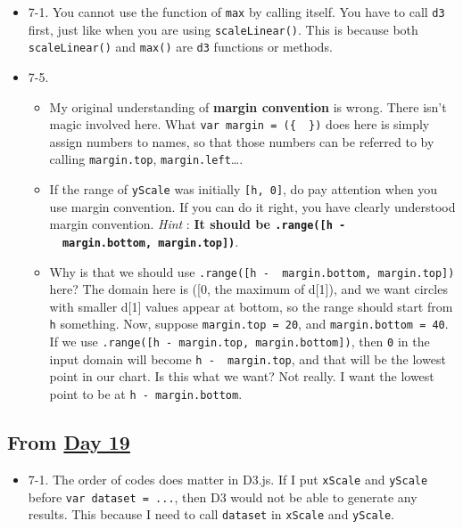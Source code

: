 \documentclass[
]{book}
\providecommand{\tightlist}{%
  \setlength{\itemsep}{0pt}\setlength{\parskip}{0pt}}
\begin{document}
\begin{itemize}
\item
  7-1. You cannot use the function of \texttt{max} by calling itself. You have to call \texttt{d3} first, just like when you are using \texttt{scaleLinear()}. This is because both \texttt{scaleLinear()} and \texttt{max()} are \texttt{d3} functions or methods.
\item
  7-5.

  \begin{itemize}
  \item
    My original understanding of \textbf{margin convention} is wrong. There isn't magic involved here. What \texttt{var\ margin\ =\ (\{\ \ \})} does here is simply assign numbers to names, so that those numbers can be referred to by calling \texttt{margin.top}, \texttt{margin.left}\ldots.
  \item
    If the range of \texttt{yScale} was initially \texttt{{[}h,\ 0{]}}, do pay attention when you use margin convention. If you can do it right, you have clearly understood margin convention. \emph{Hint} : \textbf{It should be \texttt{.range({[}h\ -\ \ margin.bottom,\ margin.top{]})}}.
  \item
    Why is that we should use \texttt{.range({[}h\ -\ \ margin.bottom,\ margin.top{]})} here? The domain here is ({[}0, the maximum of d{[}1{]}), and we want circles with smaller d{[}1{]} values appear at bottom, so the range should start from \texttt{h} something. Now, suppose \texttt{margin.top\ =\ 20}, and \texttt{margin.bottom\ =\ 40}. If we use \texttt{.range({[}h\ -\ margin.top,\ margin.bottom{]})}, then \texttt{0} in the input domain will become \texttt{h\ -\ \ margin.top}, and that will be the lowest point in our chart. Is this what we want? Not really. I want the lowest point to be at \texttt{h\ -\ margin.bottom}.
  \end{itemize}
\end{itemize}

\hypertarget{from-day-19}{%
\subsection{\texorpdfstring{From \href{https://observablehq.com/@hongtaoh/day-nineteen-spet-12-2020}{Day 19}}{From Day 19}}\label{from-day-19}}

\begin{itemize}
\tightlist
\item
  7-1. The order of codes does matter in D3.js. If I put \texttt{xScale} and \texttt{yScale} before \texttt{var\ dataset\ =\ ...}, then D3 would not be able to generate any results. This because I need to call \texttt{dataset} in \texttt{xScale} and \texttt{yScale}.
\end{itemize}
\end{document}
